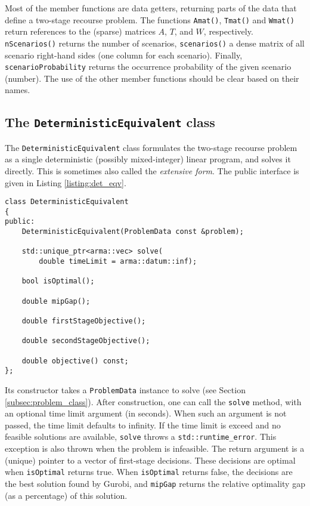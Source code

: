 \documentclass[12pt, english]{article}
\begin{document}
Most of the member functions are data getters, returning parts of the data that define a two-stage recourse problem. The functions \texttt{Amat()}, \texttt{Tmat()} and \texttt{Wmat()} return references to the (sparse) matrices $A$, $T$, and $W$, respectively. \texttt{nScenarios()} returns the number of scenarios, \texttt{scenarios()} a dense matrix of all scenario right-hand sides (one column for each scenario). Finally, \texttt{scenarioProbability} returns the occurrence probability of the given scenario (number). The use of the other member functions should be clear based on their names.

\subsection{The \texttt{DeterministicEquivalent} class}
\label{subsec:det_eqv_class}

The \texttt{DeterministicEquivalent} class formulates the two-stage recourse problem as a single deterministic (possibly mixed-integer) linear program, and solves it directly. This is sometimes also called the \textit{extensive form}. The public interface is given in Listing \ref{listing:det_eqv}.
\begin{lstlisting}[caption={Public interface of the \texttt{DeterministicEquivalent} class.},
                   label={listing:det_eqv}]
class DeterministicEquivalent
{
public:
	DeterministicEquivalent(ProblemData const &problem);
	
	std::unique_ptr<arma::vec> solve(
		double timeLimit = arma::datum::inf);
	
	bool isOptimal();
	
	double mipGap();
	
	double firstStageObjective();
	
	double secondStageObjective();
	
	double objective() const;
};
\end{lstlisting}
Its constructor takes a \texttt{ProblemData} instance to solve (see Section \ref{subsec:problem_class}). After construction, one can call the \texttt{solve} method, with an optional time limit argument (in seconds). When such an argument is not passed, the time limit defaults to infinity. If the time limit is exceed and no feasible solutions are available, \texttt{solve} throws a \texttt{std::runtime\_error}. This exception is also thrown when the problem is infeasible. The return argument is a (unique) pointer to a vector of first-stage decisions. These decisions are optimal when \texttt{isOptimal} returns true. When \texttt{isOptimal} returns false, the decisions are the best solution found by Gurobi, and \texttt{mipGap} returns the relative optimality gap (as a percentage) of this solution.
\end{document}
